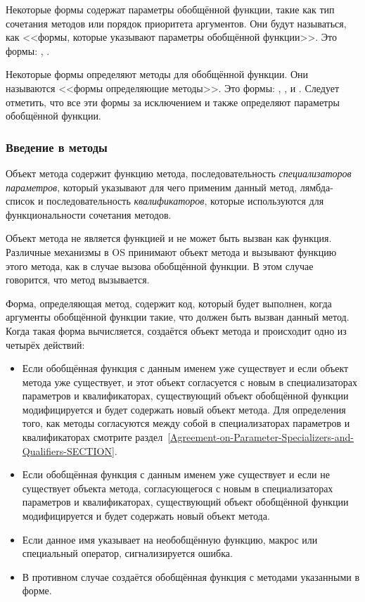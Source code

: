 Некоторые формы содержат параметры обобщённой функции, такие как тип сочетания
методов или порядок приоритета аргументов. Они будут называться, как <<формы,
которые указывают параметры обобщённой функции>>. Это формы: ,
.

Некоторые формы определяют методы для обобщённой функции. Они называются <<формы
определяющие методы>>. Это формы: , ,
 и . Следует отметить, что все эти формы за
исключением  и  также определяют параметры
обобщённой функции.

\subsubsection{Введение в методы}
\label{Introduction-to-Methods-SECTION}

Объект метода содержит функцию метода, последовательность \emph{специализаторов
  параметров}, который указывают для чего применим данный метод, лямбда-список и
последовательность \emph{квалификаторов}, которые используются для функциональности
сочетания методов.

Объект метода не является функцией и не может быть вызван как функция. Различные
механизмы в OS принимают объект метода и вызывают функцию этого метода, как в
случае вызова обобщённой функции. В этом случае говорится, что метод вызывается.

Форма, определяющая метод, содержит код, который будет выполнен, когда аргументы
обобщённой функции такие, что должен быть вызван данный метод. Когда такая форма
вычисляется, создаётся объект метода и происходит одно из четырёх действий:

\begin{itemize}
\item Если обобщённая функция с данным именем уже существует и если объект
  метода уже существует, и этот объект согласуется с новым в специализаторах
  параметров и квалификаторах, существующий объект обобщённой функции
  модифицируется и будет содержать новый объект метода. Для определения того,
  как методы согласуются между собой в специализаторах параметров и
  квалификаторах смотрите
  раздел~\ref{Agreement-on-Parameter-Specializers-and-Qualifiers-SECTION}.

\item Если обобщённая функция с данным именем уже существует и если не
  существует объекта метода, согласующегося с новым в специализаторах
  параметров и квалификаторах, существующий объект обобщённой функции
  модифицируется и будет содержать новый объект метода.
\item Если данное имя указывает на необобщённую функцию, макрос или специальный
  оператор, сигнализируется ошибка.

\item В противном случае создаётся обобщённая функция с методами указанными в
  форме.
\end{itemize}

